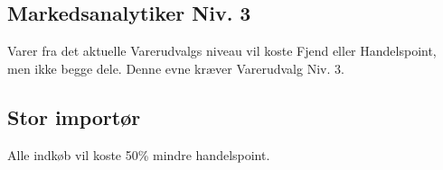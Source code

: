 \subsection*{Markedsanalytiker Niv. 3}
Varer fra det aktuelle Varerudvalgs niveau vil koste Fjend eller Handelspoint, men ikke begge dele. Denne evne kræver Varerudvalg Niv. 3.\\

\subsection*{Stor importør}
Alle indkøb vil koste 50\% mindre handelspoint.\\



